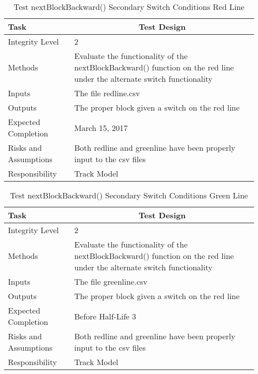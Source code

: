 \documentclass[]{article}
\begin{document}
\begin{table}[H]
	\centering
	\caption{Test nextBlockBackward() Secondary Switch Conditions Red Line}
	\begin{tabular}{|l|l|}
		\hline
		Task & \multicolumn{1}{c|}{Test Design} \\ \hline
		Integrity Level & 2 \\ \hline
		Methods & \parbox[t]{10cm}{Evaluate the functionality of the nextBlockBackward() function on the red line under the alternate switch functionality}\\ \hline
		Inputs &  The file redline.csv \\ \hline
		Outputs &  The proper block given a switch on the red line\\ \hline
		Expected Completion & March 15, 2017\\ \hline
		Risks and Assumptions & Both redline and greenline have been properly input to the csv files \\ \hline
		Responsibility & Track Model\\ \hline
	\end{tabular}
\end{table}

\begin{table}[H]
	\centering
	\caption{Test nextBlockBackward() Secondary Switch Conditions Green Line}
	\begin{tabular}{|l|l|}
		\hline
		Task & \multicolumn{1}{c|}{Test Design} \\ \hline
		Integrity Level & 2 \\ \hline
		Methods & \parbox[t]{10cm}{Evaluate the functionality of the nextBlockBackward() function on the red line under the alternate switch functionality} \\ \hline
		Inputs &  The file greenline.csv \\ \hline
		Outputs &  The proper block given a switch on the red line\\ \hline
		Expected Completion & Before Half-Life 3\\ \hline
		Risks and Assumptions & Both redline and greenline have been properly input to the csv files \\ \hline
		Responsibility & Track Model\\ \hline
	\end{tabular}
\end{table}
\end{document}
